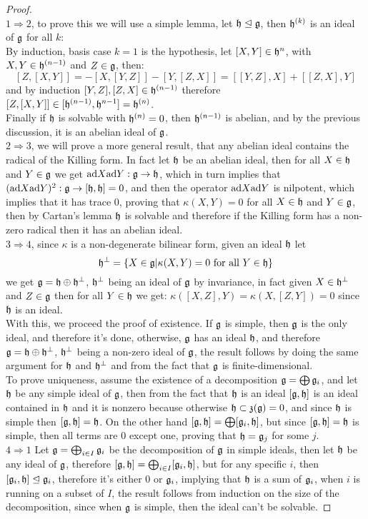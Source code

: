 \begin{proof}\\
	$1 \Rightarrow 2$, to prove this we will use a simple lemma, let $\mathfrak{h} \trianglelefteq \mathfrak{g}$, then $\mathfrak{h}^{(k)}$ is an ideal of $\mathfrak{g}$ for all $k$:\\
	By induction, basis case $k=1$ is the hypothesis, let $[X,Y] \in \mathfrak{h}^{n}$, with $X,Y \in \mathfrak{h}^{(n-1)}$ and $Z \in \mathfrak{g}$, then:
	$$[Z,[X,Y]] = -[X,[Y,Z]]-[Y,[Z,X]] = [[Y,Z],X] + [[Z,X],Y]$$
	and by induction $[Y,Z],[Z,X]\in \mathfrak{h}^{(n-1)}$ therefore $[Z,[X,Y]] \in [\mathfrak{h}^{(n-1)},\mathfrak{h}^{n-1}] = \mathfrak{h}^{(n)}$.\\
	Finally if $\mathfrak{h}$ is solvable with $\mathfrak{h}^{(n)}=0$, then $\mathfrak{h}^{(n-1)}$ is abelian, and by the previous discussion, it is an abelian ideal of $\mathfrak{g}$.\\
	$2 \Rightarrow 3$, we will prove a more general result, that any abelian ideal contains the radical of the Killing form. In fact let $\mathfrak{h}$ be an abelian ideal, then for all $X \in \mathfrak{h}$ and $Y \in \mathfrak{g}$ we get $\text{ad} X \text{ad} Y : \mathfrak{g} \rightarrow \mathfrak{h}$, which in turn implies that $(\text{ad} X \text{ad} Y)^2 : \mathfrak{g} \rightarrow [\mathfrak{h},\mathfrak{h}] = 0$, and then the operator $\text{ad} X \text{ad} Y$ is nilpotent, which implies that it has trace $0$, proving that $\kappa(X,Y)=0$ for all $X \in \mathfrak{h}$ and $Y \in \mathfrak{g}$, then by Cartan's lemma $\mathfrak{h}$ is solvable and therefore if the Killing form has a non-zero radical then it has an abelian ideal.\\
	$3 \Rightarrow 4$, since $\kappa$ is a non-degenerate bilinear form, given an ideal $\mathfrak{h}$ let $$\mathfrak{h}^\perp = \{X \in \mathfrak{g} | \kappa(X,Y)=0 \text{ for all } Y \in \mathfrak{h}\}$$ we get $\mathfrak{g} = \mathfrak{h} \oplus \mathfrak{h}^\perp$, $\mathfrak{h}^\perp$ being an ideal of $\mathfrak{g}$ by invariance, in fact given $X\in \mathfrak{h}^\perp$ and $Z \in \mathfrak{g}$ then for all $Y \in \mathfrak{h}$ we get: $\kappa([X,Z],Y) = \kappa(X,[Z,Y])=0$ since $\mathfrak{h}$ is an ideal.\\
	With this, we proceed the proof of existence. If $\mathfrak{g}$ is simple, then $\mathfrak{g}$ is the only ideal, and therefore it's done, otherwise, $\mathfrak{g}$ has an ideal $\mathfrak{h}$, and therefore $\mathfrak{g} = \mathfrak{h} \oplus \mathfrak{h}^\perp$, $\mathfrak{h}^\perp$ being a non-zero ideal of $\mathfrak{g}$, the result follows by doing the same argument for $\mathfrak{h}$ and $\mathfrak{h}^\perp$ and from the fact that $\mathfrak{g}$ is finite-dimensional.\\
	To prove uniqueness, assume the existence of a decomposition $\mathfrak{g} = \bigoplus \mathfrak{g}_i$, and let $\mathfrak{h}$ be any simple ideal of $\mathfrak{g}$, then from the fact that $\mathfrak{h}$ is an ideal $[\mathfrak{g},\mathfrak{h}]$ is an ideal contained in $\mathfrak{h}$ and it is nonzero because otherwise $\mathfrak{h}\subset \mathfrak{z}(\mathfrak{g})=0$, and since $\mathfrak{h}$ is simple then $[\mathfrak{g},\mathfrak{h}]=\mathfrak{h}$. On the other hand $[\mathfrak{g},\mathfrak{h}]=\bigoplus[\mathfrak{g}_i,\mathfrak{h}]$, but since $[\mathfrak{g},\mathfrak{h}]=\mathfrak{h}$ is simple, then all terms are $0$ except one, proving that $\mathfrak{h}=\mathfrak{g}_j$ for some $j$.\\
	$4 \Rightarrow 1$ Let $\mathfrak{g}= \bigoplus_{i \in I} \mathfrak{g}_i$ be the decomposition of $\mathfrak{g}$ in simple ideals, then let $\mathfrak{h}$ be any ideal of $\mathfrak{g}$, therefore $[\mathfrak{g},\mathfrak{h}] = \bigoplus_{i \in I} [\mathfrak{g}_i,\mathfrak{h}]$, but for any specific $i$, then $[\mathfrak{g}_i,\mathfrak{h}]\trianglelefteq \mathfrak{g}_i$, therefore it's either $0$ or $\mathfrak{g}_i$, implying that $\mathfrak{h}$ is a sum of $\mathfrak{g}_i$, when $i$ is running on a subset of $I$, the result follows from induction on the size of the decomposition, since when $\mathfrak{g}$ is simple, then the ideal can't be solvable.
\end{proof}
